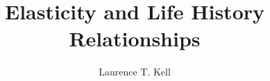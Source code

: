 \documentclass[%
nonumbib,      %
%
]{nrc1}                          %
\begin{document}





\title{Elasticity and Life History Relationships}

\author{Laurence T. Kell}        
\address{ICCAT Secretariat, C/Coraz\'{o}n de Mar\'{\i}a, 8. 28002 Madrid, Spain; ~Laurie.Kell@iccat.int; ~Phone: +34 914 165 600 ~Fax: +34 914 152 612.}
        


\end{document}

